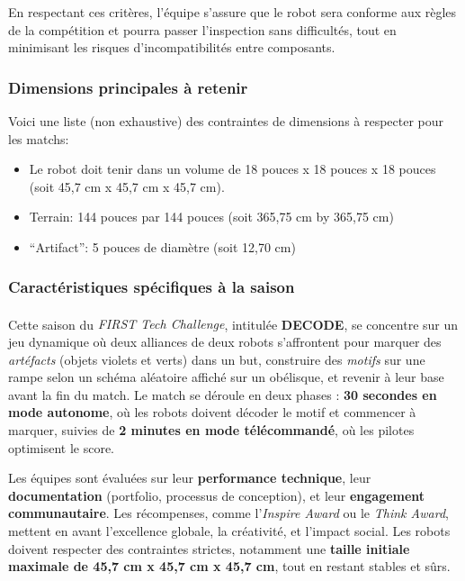 \documentclass[12pt, a4paper]{report}
\begin{document}
    En respectant ces critères, l'équipe s'assure que le robot sera conforme aux règles de la compétition et pourra passer l'inspection sans difficultés, tout en minimisant les risques d'incompatibilités entre composants.

    \subsubsection{Dimensions principales à retenir}

    Voici une liste (non exhaustive) des contraintes de dimensions à respecter pour les matchs:
    \begin{itemize}
        \item Le robot doit tenir dans un volume de 18 pouces x 18 pouces x 18 pouces (soit 45,7 cm x 45,7 cm x 45,7 cm).
        \item Terrain: 144 pouces par 144 pouces (soit 365,75 cm by 365,75 cm)
        \item \enquote{Artifact}: 5 pouces de diamètre (soit 12,70 cm)
    \end{itemize}

    \subsubsection{Caractéristiques spécifiques à la saison}

    Cette saison du \textit{FIRST\textsuperscript{\tiny\textregistered} Tech Challenge}, intitulée \textbf{DECODE\texttrademark}, se concentre sur un jeu dynamique où deux alliances de deux robots s'affrontent pour marquer des \textit{artéfacts} (objets violets et verts) dans un but, construire des \textit{motifs} sur une rampe selon un schéma aléatoire affiché sur un obélisque, et revenir à leur base avant la fin du match. Le match se déroule en deux phases : \textbf{30 secondes en mode autonome}, où les robots doivent décoder le motif et commencer à marquer, suivies de \textbf{2 minutes en mode télécommandé}, où les pilotes optimisent le score.

    Les équipes sont évaluées sur leur \textbf{performance technique}, leur \textbf{documentation} (portfolio, processus de conception), et leur \textbf{engagement communautaire}. Les récompenses, comme l'\textit{Inspire Award} ou le \textit{Think Award}, mettent en avant l'excellence globale, la créativité, et l'impact social. Les robots doivent respecter des contraintes strictes, notamment une \textbf{taille initiale maximale de 45,7 cm x 45,7 cm x 45,7 cm}, tout en restant stables et sûrs.
\end{document}
